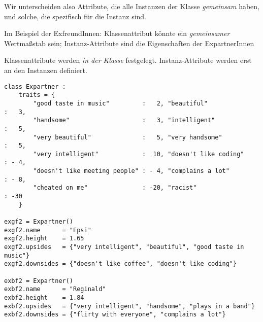 \begin{frame}
%
\begin{hintbox}
Wir unterscheiden also Attribute, die alle Instanzen der Klasse \emph{gemeinsam} haben, und solche, die spezifisch für die Instanz sind.

Im Beispiel der ExfreundInnen: Klassenattribut könnte ein \emph{gemeinsamer} Wertmaßstab sein; Instanz-Attribute sind die Eigenschaften der ExpartnerInnen

Klassenattribute werden \emph{in der Klasse} festgelegt. Instanz-Attribute werden erst an den Instanzen definiert.
\end{hintbox}
%
\end{frame}


\begin{frame}[fragile]
%
\begin{codebox}
\begin{verbatim}
class Expartner :
    traits = {
        "good taste in music"         :   2, "beautiful"                   :   3,
        "handsome"                    :   3, "intelligent"                 :   5,
        "very beautiful"              :   5, "very handsome"               :   5,
        "very intelligent"            :  10, "doesn't like coding"         : - 4,
        "doesn't like meeting people" : - 4, "complains a lot"             : - 8,
        "cheated on me"               : -20, "racist"                      : -30
    }

exgf2 = Expartner()
exgf2.name      = "Epsi"
exgf2.height    = 1.65
exgf2.upsides   = {"very intelligent", "beautiful", "good taste in music"}
exgf2.downsides = {"doesn't like coffee", "doesn't like coding"}

exbf2 = Expartner()
exbf2.name      = "Reginald"
exbf2.height    = 1.84
exbf2.upsides   = {"very intelligent", "handsome", "plays in a band"}
exbf2.downsides = {"flirty with everyone", "complains a lot"}
\end{verbatim}
\end{codebox}
%
\end{frame}


